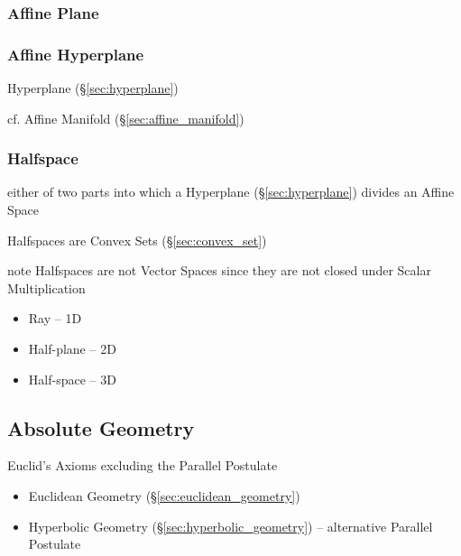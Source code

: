 \subsubsection{Affine Plane}\label{sec:affine_plane}

\subsubsection{Affine Hyperplane}\label{sec:affine_hyperplane}

Hyperplane (\S\ref{sec:hyperplane})

cf. Affine Manifold (\S\ref{sec:affine_manifold})



\subsubsection{Halfspace}\label{sec:halfspace}

either of two parts into which a Hyperplane (\S\ref{sec:hyperplane}) divides an
Affine Space

Halfspaces are Convex Sets (\S\ref{sec:convex_set})

note Halfspaces are not Vector Spaces since they are not closed under Scalar
Multiplication

\begin{itemize}
  \item Ray -- 1D
  \item Half-plane -- 2D
  \item Half-space -- 3D
\end{itemize}



\subsection{Absolute Geometry}\label{sec:absolute_geometry}

Euclid's Axioms excluding the Parallel Postulate

\begin{itemize}
  \item Euclidean Geometry (\S\ref{sec:euclidean_geometry})
  \item Hyperbolic Geometry (\S\ref{sec:hyperbolic_geometry}) -- alternative
    Parallel Postulate
\end{itemize}

